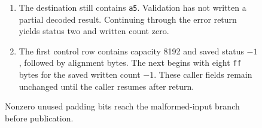 \begin{figure}[htbp]
\begin{minipage}{\linewidth}
\begin{enumerate}
      \item The destination still contains \texttt{a5}. Validation has not written a partial decoded result. Continuing through the error return yields status two and written count zero.
      \item The first control row contains capacity 8192 and saved status $-1$, followed by alignment bytes. The next begins with eight \texttt{ff} bytes for the saved written count $-1$. These caller fields remain unchanged until the caller resumes after return.
    \end{enumerate}
  \end{minipage}
  \caption{Nonzero unused padding bits reach the malformed-input branch before publication.}
  \label{capture:028-base64-f02}
  \label{base64-f02}
\end{figure}
\par
